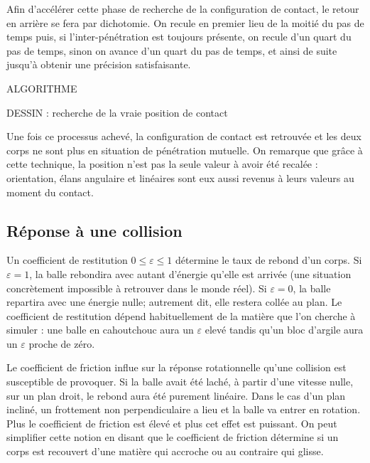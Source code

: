 Afin d'accélérer cette phase de recherche de la configuration de contact, le retour en arrière se fera par dichotomie. On recule en premier lieu de la moitié du pas de temps puis, si l'inter-pénétration est toujours présente, on recule d'un quart du pas de temps, sinon on avance d'un quart du pas de temps, et ainsi de suite jusqu'à obtenir une précision satisfaisante.

ALGORITHME

DESSIN : recherche de la vraie position de contact

Une fois ce processus achevé, la configuration de contact est retrouvée et les deux corps ne sont plus en situation de pénétration mutuelle. On remarque que grâce à cette technique, la position n'est pas la seule valeur à avoir été recalée : orientation, élans angulaire et linéaires sont eux aussi revenus à leurs valeurs au moment du contact.

\subsection{Réponse à une collision}

Un coefficient de restitution $0 \leq \varepsilon \leq 1$ détermine le taux de rebond d'un corps. Si $\varepsilon = 1$, la balle rebondira avec autant d'énergie qu'elle est arrivée (une situation concrètement impossible à retrouver dans le monde réel). Si $\varepsilon = 0$, la balle repartira avec une énergie nulle; autrement dit, elle restera collée au plan. Le coefficient de restitution dépend habituellement de la matière que l'on cherche à simuler : une balle en cahoutchouc aura un $\varepsilon$ elevé tandis qu'un bloc d'argile aura un $\varepsilon$ proche de zéro.

Le coefficient de friction influe sur la réponse rotationnelle qu'une collision est susceptible de provoquer. Si la balle avait été laché, à partir d'une vitesse nulle, sur un plan droit, le rebond aura été purement linéaire. Dans le cas d'un plan incliné, un frottement non perpendiculaire a lieu et la balle va entrer en rotation. Plus le coefficient de friction est élevé et plus cet effet est puissant. On peut simplifier cette notion en disant que le coefficient de friction détermine si un corps est recouvert d'une matière qui accroche ou au contraire qui glisse.

\cite{newton87}

